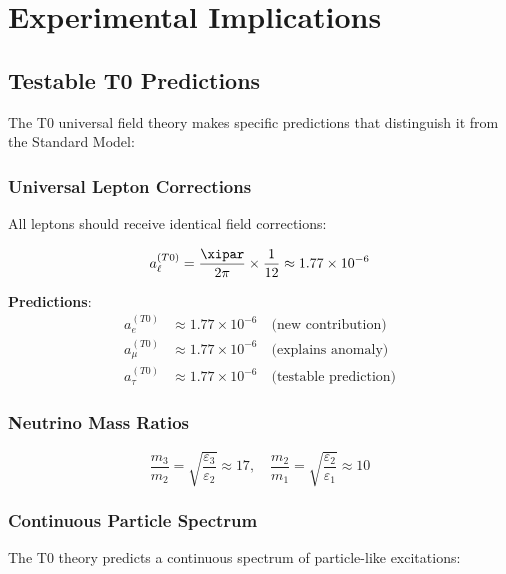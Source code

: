 	\section{Experimental Implications}
	
	\subsection{Testable T0 Predictions}
	
	The T0 universal field theory makes specific predictions that distinguish it from the Standard Model:
	
	\subsubsection{Universal Lepton Corrections}
	
	All leptons should receive identical field corrections:
	
	\begin{equation}
		a_\ell^{(T0)} = \frac{\xipar}{2\pi} \times \frac{1}{12} \approx 1.77 \times 10^{-6}
		\label{eq:universal_lepton_correction}
	\end{equation}
	
	\textbf{Predictions}:
	\begin{align}
		a_e^{(T0)} &\approx 1.77 \times 10^{-6} \quad \text{(new contribution)} \\
		a_\mu^{(T0)} &\approx 1.77 \times 10^{-6} \quad \text{(explains anomaly)} \\
		a_\tau^{(T0)} &\approx 1.77 \times 10^{-6} \quad \text{(testable prediction)}
	\end{align}
	
	\subsubsection{Neutrino Mass Ratios}
	
	\begin{equation}
		\frac{m_3}{m_2} = \sqrt{\frac{\varepsilon_3}{\varepsilon_2}} \approx 17, \quad \frac{m_2}{m_1} = \sqrt{\frac{\varepsilon_2}{\varepsilon_1}} \approx 10
		\label{eq:neutrino_mass_ratios}
	\end{equation}
	
	\subsubsection{Continuous Particle Spectrum}
	
	The T0 theory predicts a continuous spectrum of particle-like excitations:
	
